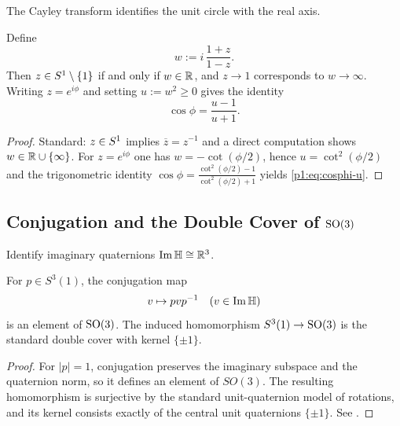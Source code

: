 \documentclass[11pt]{article}
\begin{document}
The Cayley transform identifies the unit circle with the real axis.

\begin{theorem}
\label{p1:thm:cayley}
Define
\begin{equation}
\label{p1:eq:cayley}
w:=i\,\frac{1+z}{1-z}.
\end{equation}
Then $z\in S^1\setminus\{1\}$ if and only if $w\in\mathbb{R}$, and $z\to 1$ corresponds to $w\to\infty$. Writing
$z=e^{i\phi}$ and setting $u:=w^2\ge0$ gives the identity
\begin{equation}
\label{p1:eq:cosphi-u}
\cos\phi=\frac{u-1}{u+1}.
\end{equation}
\end{theorem}

\begin{proof}
Standard: $z\in S^1$ implies $\overline{z}=z^{-1}$ and a direct computation shows $w\in\mathbb{R}\cup\{\infty\}$.
For $z=e^{i\phi}$ one has $w=-\cot(\phi/2)$, hence $u=\cot^2(\phi/2)$ and the trigonometric identity
$\cos\phi=\frac{\cot^2(\phi/2)-1}{\cot^2(\phi/2)+1}$ yields \eqref{p1:eq:cosphi-u}.
\end{proof}


\subsection{\texorpdfstring{Conjugation and the Double Cover of $\mathrm{SO}(3)$}{Conjugation and the Double Cover of SO(3)}}

Identify imaginary quaternions $\operatorname{Im} \mathbb{H} \cong \mathbb{R}^3$.

\begin{theorem}
\label{p1:thm:unit-quaternion-double-cover-so3}
For $p \in S^3(1)$, the conjugation map
\[
v \mapsto p v p^{-1} \quad (v \in \operatorname{Im} \mathbb{H})
\]
is an element of $\mathrm{SO}(3)$. The induced homomorphism $S^3(1) \to \mathrm{SO}(3)$ is the standard double cover with kernel $\{\pm 1\}$.
\cite{helgason1984groups}
\end{theorem}

\begin{proof}
For \(|p|=1\), conjugation preserves the imaginary subspace and the quaternion norm, so it defines an element of \(SO(3)\). The resulting homomorphism is surjective by the standard unit-quaternion model of rotations, and its kernel consists exactly of the central unit quaternions \(\{\pm1\}\). See \cite{helgason1984groups}.
\end{proof}
\end{document}
